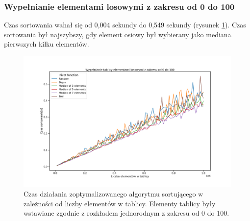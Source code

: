 \documentclass{article}
\begin{document}
        \subsubsection{Wypełnianie elementami losowymi z zakresu od 0 do 100}
        Czas sortowania wahał się od 0,004 sekundy do 0,549 sekundy (rysunek \ref{fig:optimized:100_fill}). Czas sortowania był najszybszy, gdy element osiowy był wybierany jako mediana pierwszych kilku elementów.
        \begin{figure}
            \centering
            \includegraphics[width=\textwidth]{ryciny/optymalizacje/lineplot-100-fill.png}
            \caption{Czas działania zoptymalizowanego algorytmu sortującego w zależności od liczby elementów w tablicy. Elementy tablicy były wstawiane zgodnie z rozkładem jednorodnym z zakresu od 0 do 100.}
            \label{fig:optimized:100_fill}
        \end{figure}
        
\end{document}
